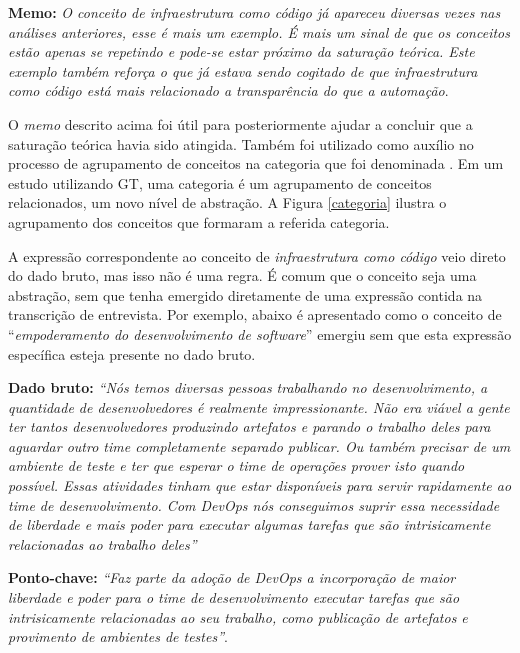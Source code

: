 \textbf{Memo:} \textit{O conceito de infraestrutura como código já apareceu
diversas vezes nas análises anteriores, esse é mais um exemplo. É mais um sinal
de que os conceitos estão apenas se repetindo e pode-se estar próximo da
saturação teórica. Este exemplo também reforça o que já estava sendo cogitado
de que infraestrutura como código está mais relacionado a transparência do que
a automação}.

O {\it memo} descrito acima foi útil para posteriormente ajudar a concluir que
a saturação teórica havia sido atingida. Também foi utilizado como auxílio no
processo de agrupamento de conceitos na categoria que foi denominada
. Em um estudo utilizando \acrshort{GT},
uma categoria é um agrupamento de  conceitos relacionados, um novo nível de
abstração. A Figura \ref{categoria} ilustra o agrupamento dos conceitos
que formaram a referida categoria.


A expressão correspondente ao conceito de \emph{infraestrutura como código}
veio direto do dado bruto, mas isso não é uma regra. É comum que o conceito
seja uma abstração, sem que tenha emergido diretamente de uma expressão contida na
transcrição de entrevista. Por exemplo, abaixo é apresentado como o conceito
de ``\emph{empoderamento do desenvolvimento de software}'' emergiu sem que esta
expressão específica esteja presente no dado bruto.

\textbf{Dado bruto:} {\it ``Nós temos diversas pessoas trabalhando no
desenvolvimento, a quantidade de desenvolvedores é realmente impressionante.
Não era viável a gente ter tantos desenvolvedores produzindo artefatos e
parando o trabalho deles para aguardar outro time completamente separado
publicar. Ou também precisar de um ambiente de teste e ter que esperar o time
de operações prover isto quando possível. Essas atividades tinham que estar
disponíveis para servir rapidamente ao time de desenvolvimento. Com DevOps
nós conseguimos suprir essa necessidade de liberdade e mais poder para executar
algumas tarefas que são intrisicamente relacionadas ao trabalho deles''}

{\bf Ponto-chave:} \textit{``Faz parte da adoção de DevOps a incorporação
de maior liberdade e poder para o time de desenvolvimento executar tarefas que
são intrisicamente relacionadas ao seu trabalho, como publicação de artefatos
e provimento de ambientes de testes''}.

